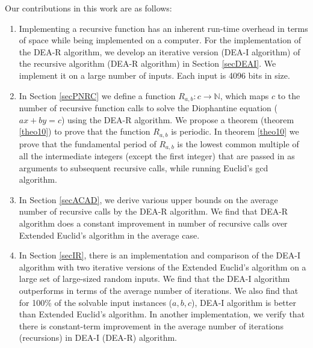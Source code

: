 \documentclass[pdflatex,sn-mathphys-num]{sn-jnl}%
\theoremstyle{thmstyleone}%
\theoremstyle{thmstyletwo}%
\theoremstyle{thmstylethree}%
\begin{document}
 \par Our contributions in this work are as follows:
 \begin{enumerate}
     \item Implementing a recursive function has an inherent run-time overhead in terms of space while being implemented on a computer. For the implementation of the DEA-R algorithm, we develop an iterative version (DEA-I algorithm) of the recursive algorithm (DEA-R algorithm) in Section \ref{secDEAI}. We implement it on a large number of inputs. Each input is 4096 bits in size. 
     \item In Section \ref{secPNRC} we define a function $R_{a,b}:c \to \mathbb{N}$, which maps $c$ to the number of recursive function calls to solve the Diophantine equation ($ax+by=c$) using the DEA-R algorithm. We propose a theorem (theorem \ref{theo10}) to prove that the function $R_{a,b}$ is periodic. In theorem \ref{theo10} we prove that the fundamental period of $R_{a,b}$ is the lowest common multiple of all the intermediate integers (except the first integer) that are passed in as arguments to subsequent recursive calls, while running Euclid's gcd algorithm. 
     \item In Section \ref{secACAD}, we derive various upper bounds on the average number of recursive calls by the DEA-R algorithm.  We find that DEA-R algorithm does a constant improvement in number of recursive calls over Extended Euclid's algorithm in the average case.
    
      \item In Section \ref{secIR}, there is an implementation and comparison of the DEA-I algorithm with two iterative versions of the Extended Euclid's algorithm on a large set of large-sized random inputs. We find that the DEA-I algorithm outperforms in terms of the average number of iterations. We also find that for 100\% of the solvable input instances ($a,b,c$), DEA-I algorithm is better than Extended Euclid's algorithm. In another implementation, we verify that there is constant-term improvement in the average number of iterations (recursions) in DEA-I (DEA-R) algorithm.
 
 \end{enumerate}
\end{document}
